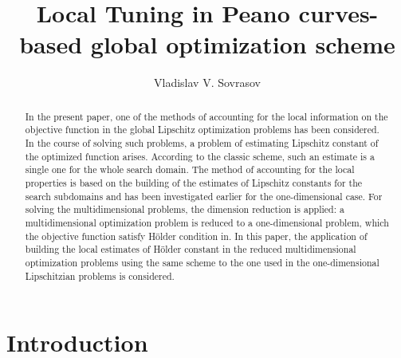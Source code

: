 \documentclass[procedia]{easychair}
\title{Local Tuning in Peano curves-based global optimization scheme}
\author{
    Vladislav V. Sovrasov%
}
\institute{
  State university of Nizhny Novgorod,
  Nizhny Novgorod, Russia\\
  \email{sovrasov.vlad@gmail.com}
 }
\begin{document}
\maketitle


\begin{abstract}
  In the present paper, one of the methods of accounting for the local information on
  the objective function in the global Lipschitz optimization problems has been considered.
  In the course of solving such problems, a problem of estimating Lipschitz constant of the
  optimized function arises. According to the classic scheme, such an estimate is a single one
  for the whole search domain. The method of accounting for the local properties is based on
  the building of the estimates of Lipschitz constants for the search subdomains and has been
  investigated earlier for the one-dimensional case. For solving the multidimensional problems,
  the dimension reduction is applied: a multidimensional optimization problem is reduced to
  a one-dimensional problem, which the objective function satisfy Hölder condition in.
  In this paper, the application of building the local estimates of Hölder constant in the
  reduced multidimensional optimization problems using the same scheme to the one used
  in the one-dimensional Lipschitzian problems is considered.
\end{abstract}


%
%


\section{Introduction}
\label{sect:introduction}
\end{document}
